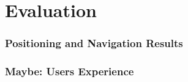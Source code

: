 \chapter{Evaluation}
\subsection{Positioning and Navigation Results}
\subsection{Maybe: Users Experience} %
